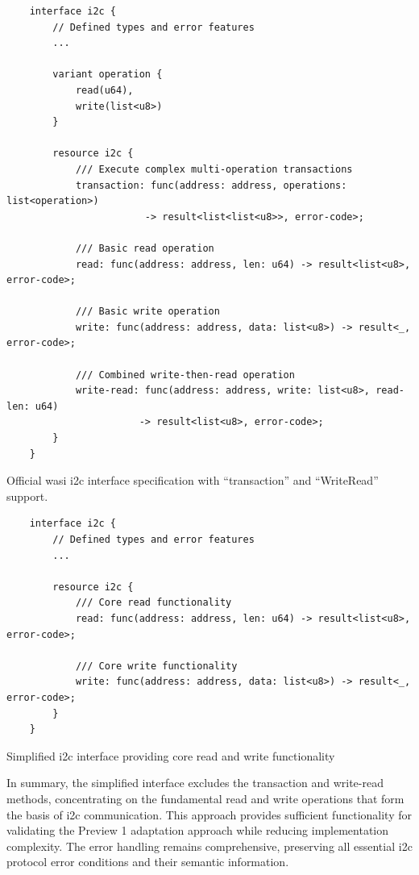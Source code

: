 \begin{listing}[H]
    \begin{verbatim}
    interface i2c {
        // Defined types and error features
        ... 
        
        variant operation {
            read(u64),
            write(list<u8>)
        }
    
        resource i2c {
            /// Execute complex multi-operation transactions
            transaction: func(address: address, operations: list<operation>) 
                        -> result<list<list<u8>>, error-code>;
            
            /// Basic read operation
            read: func(address: address, len: u64) -> result<list<u8>, error-code>;
            
            /// Basic write operation  
            write: func(address: address, data: list<u8>) -> result<_, error-code>;
            
            /// Combined write-then-read operation
            write-read: func(address: address, write: list<u8>, read-len: u64) 
                       -> result<list<u8>, error-code>;
        }
    }
    \end{verbatim}
    \caption{Official \acrshort{wasi} \acrshort{i2c} interface specification with ``transaction'' and ``WriteRead'' support.}
    \label{lst:official-i2c-interface}
\end{listing}

\begin{listing}[H]
    \begin{verbatim}
    interface i2c {
        // Defined types and error features
        ... 
    
        resource i2c {
            /// Core read functionality
            read: func(address: address, len: u64) -> result<list<u8>, error-code>;
            
            /// Core write functionality
            write: func(address: address, data: list<u8>) -> result<_, error-code>;
        }
    }
    \end{verbatim}
    \caption{Simplified \acrshort{i2c} interface providing core read and write functionality}
    \label{lst:simplified-i2c-interface}
\end{listing}

In summary, the simplified interface excludes the transaction and write-read methods, concentrating on the fundamental read and write operations that form the basis of \acrshort{i2c} communication. This approach provides sufficient functionality for validating the Preview 1 adaptation approach while reducing implementation complexity. The error handling remains comprehensive, preserving all essential \acrshort{i2c} protocol error conditions and their semantic information.

